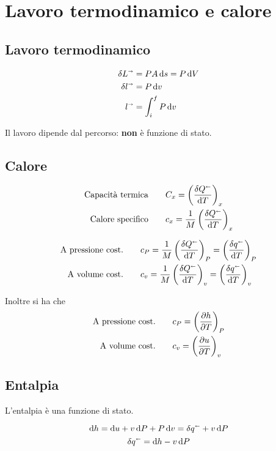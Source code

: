 \section{Lavoro termodinamico e calore}

\subsection{Lavoro termodinamico}

\begin{align*}
    \delta L^\shortrightarrow &= PA\dd{s} = P\dd{V} \\
    \delta l^\shortrightarrow &= P\dd{v} \\
    l^\shortrightarrow &= \int_i^f P\dd{v}
\end{align*}

Il lavoro dipende dal percorso: \textbf{non} è funzione di stato.

\subsection{Calore}

\begin{align*}
    \text{Capacità termica} &\qquad C_x = \left(\frac{\delta Q^\shortleftarrow}{\dd{T}}\right)_x \\
    \text{Calore specifico} &\qquad c_x = \frac{1}{M} \left(\frac{\delta Q^\shortleftarrow}{\dd{T}}\right)_x
\end{align*}

\begin{align*}
    \text{A pressione cost.} &\qquad c_P = \frac{1}{M} \left(\frac{\delta Q^\shortleftarrow}{\dd{T}}\right)_P = \left(\frac{\delta q^\shortleftarrow}{\dd{T}}\right)_P \\
    \text{A volume cost.} &\qquad c_v = \frac{1}{M} \left(\frac{\delta Q^\shortleftarrow}{\dd{T}}\right)_v = \left(\frac{\delta q^\shortleftarrow}{\dd{T}}\right)_v
\end{align*}

Inoltre si ha che
\begin{align*}
    \text{A pressione cost.} &\qquad c_P = \qty(\pdv{h}{T})_P\\
    \text{A volume cost.} &\qquad c_v = \qty(\pdv{u}{T})_v
\end{align*}

\subsection{Entalpia}

L'entalpia è una funzione di stato.

\[ \dd{h} = \dd{u} + v\dd{P} + P\dd{v} = \delta q^\shortleftarrow + v\dd{P} \]
\[ \delta q^\shortleftarrow = \dd{h} - v\dd{P} \]
